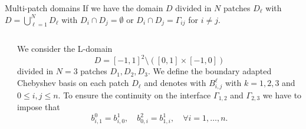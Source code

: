 \documentclass{beamer}
\begin{document}
\begin{frame}{Multi-patch domains}
	If we have the domain $D$ divided in $N$ patches $D_\ell$ with $D = \bigcup_{\ell=1}^{N} D_\ell$ with $D_i \cap D_j = \emptyset$ or $D_i \cap D_j = \Gamma_{ij}$ for $i \neq j$.
	\begin{columns}
		\begin{column}{0.3\textwidth}
			\begin{center}
			\end{center}
		\end{column}%
		\begin{column}{0.7\textwidth}
			We consider the L-domain 
			\[ D = [-1, 1]^2\setminus ([0,1]\times [-1,0]) \] 
			divided in $N=3$ patches $ D_1, D_2, D_3 $.
			We define the boundary adapted Chebyshev basis on each patch $D_\ell$ and denotes with $B_{i,j}^{\ell}$ with $k=1,2,3$ and $0 \le i,j \le n$. To ensure the continuity on the interface $\Gamma_{1,2}$ and $\Gamma_{2,3}$ we have to impose that
			\[ b^{0}_{i, 1} = b^{1}_{i,0}, \quad b^{2}_{0,i} = b^{1}_{1, i}, \quad \forall i = 1, \dots, n.\]
		\end{column}
	\end{columns}
\end{frame}

\end{document}
